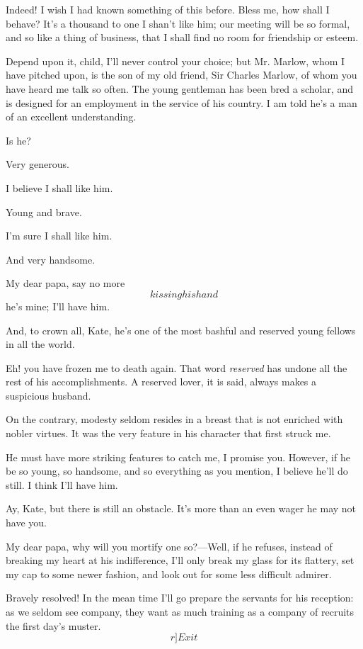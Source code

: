 \documentclass{book}
\begin{document}
\8  Indeed!  I wish I had known something of this
before.  Bless me, how shall I behave?  It's a thousand to one I
shan't like him; our meeting will be so formal, and so like a thing of
business, that I shall find no room for friendship or esteem.

\3  Depend upon it, child, I'll never control your choice; but
Mr. Marlow, whom I have pitched upon, is the son of my old friend, Sir
Charles Marlow, of whom you have heard me talk so often.  The young
gentleman has been bred a scholar, and is designed for an employment in
the service of his country.  I am told he's a man of an excellent
understanding.

\8  Is he?

\3  Very generous.

\8  I believe I shall like him.

\3  Young and brave.

\8  I'm sure I shall like him.

\3  And very handsome.

\8  My dear papa, say no more \[kissing his hand\] he's
mine; I'll have him.

\3  And, to crown all, Kate, he's one of the most bashful and
reserved young fellows in all the world.

\8  Eh! you have frozen me to death again.  That word
\textit{reserved} has undone all the rest of his accomplishments.  A reserved
lover, it is said, always makes a suspicious husband.

\3  On the contrary, modesty seldom resides in a breast that
is not enriched with nobler virtues.  It was the very feature in his
character that first struck me.

\8  He must have more striking features to catch me, I
promise you.  However, if he be so young, so handsome, and so
everything as you mention, I believe he'll do still.  I think I'll have
him.

\3  Ay, Kate, but there is still an obstacle.  It's more than
an even wager he may not have you.

\8  My dear papa, why will you mortify one so?---Well, if
he refuses, instead of breaking my heart at his indifference, I'll only
break my glass for its flattery, set my cap to some newer fashion, and
look out for some less difficult admirer.

\3  Bravely resolved!  In the mean time I'll go prepare the
servants for his reception: as we seldom see company, they want as much
training as a company of recruits the first day's muster.  \[r]Exit\]
\end{document}
